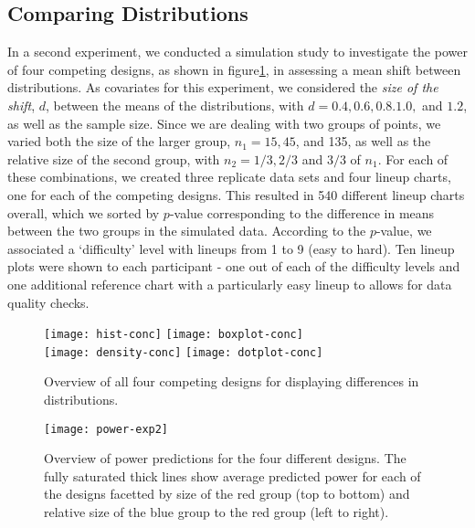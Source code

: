 \subsection{Comparing Distributions}
In a second experiment, we conducted a simulation study to investigate the power of four competing designs, as shown in figure\ref{fig:expii}, in assessing a mean shift between distributions. As covariates for this experiment, we considered the {\it size of the shift}, $d$, between the means of the distributions, with $d=0.4, 0.6, 0.8. 1.0,$ and $1.2$, as well as the sample size.  Since we are dealing with two groups of points, we varied both the size of the larger group, $n_1 = 15, 45$, and 135, as well as the relative size of the second group, with $n_2 = 1/3, 2/3$ and $3/3$ of $n_1$. For each of these combinations, we created three replicate data sets and four lineup charts, one for each of the competing designs. This resulted in 540 different lineup charts overall, which we sorted by $p$-value corresponding to the difference in means between the two groups in the simulated data. According to the $p$-value, we associated a `difficulty' level with lineups from 1 to 9 (easy to hard). Ten lineup plots were shown to each participant - one out of each of the difficulty levels and one additional reference chart with a particularly easy lineup  to allows for data quality checks.
\begin{figure} [hbtp]
   \centering
   \texttt{[image: hist-conc]} 
   \texttt{[image: boxplot-conc]} \\
   \texttt{[image: density-conc]} 
   \texttt{[image: dotplot-conc]} 
   \caption{Overview of all four competing designs for displaying differences in distributions.}
   \label{fig:expii}
\end{figure}

\begin{figure*}[htbp] %
   \centering
   \texttt{[image: power-exp2]} 
   \caption{Overview of power predictions for the four different designs. The fully saturated thick lines show average predicted power for each of the designs facetted by size of the red group (top to bottom) and relative size of the blue group to the red group (left to right). }
   \label{fig:power2}
\end{figure*}


